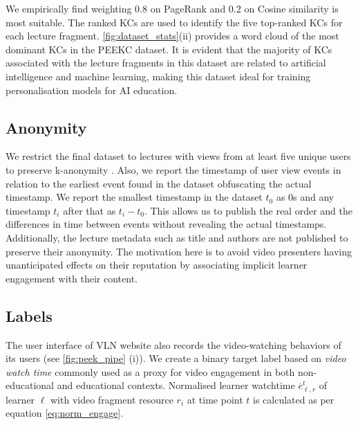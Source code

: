\documentclass[letterpaper]{article} %
\begin{document}
We empirically find weighting 0.8 on PageRank and 0.2 on Cosine similarity is most suitable. The ranked KCs are used to identify the five top-ranked KCs for each lecture fragment.
\figurename{ \ref{fig:dataset_stats}(ii)} provides a word cloud of the most dominant KCs in the PEEKC dataset. It is evident that the majority of KCs associated with the lecture fragments in this dataset are related to artificial intelligence and machine learning, making this dataset ideal for training personalisation models for AI education.

\subsection{Anonymity}

We restrict the final dataset to lectures with views from at least five unique users to preserve k-anonymity \cite{orcas_dataset}. Also, we report the timestamp of user view events in relation to the earliest event found in the dataset obfuscating the actual timestamp. We report the smallest timestamp in the dataset $t_0$ as 0s and any timestamp $t_i$ after that as $t_i - t_0$. This allows us to publish the real order and the differences in time between events without revealing the actual timestamps. Additionally, the lecture metadata such as title and authors are not published to preserve their anonymity. The motivation here is to avoid video presenters having unanticipated effects on their reputation by associating implicit learner engagement with their content.


\subsection{Labels}
The user interface of VLN website also records the video-watching behaviors of its users (see \figurename{ \ref{fig:peek_pipe} (i)}).
We create a binary target label based on
\emph{video watch time} commonly used as a proxy for video engagement in both non-educational \cite{Covington2016,beyondviews} and educational \cite{Guo_vid_prod,truelearn} contexts. Normalised learner watchtime $\overline{e}^t_{\ell,r}$ of learner $\ell$ with video fragment resource $r_i$ at time point $t$ is calculated as per equation \ref{eq:norm_engage}.
\end{document}
